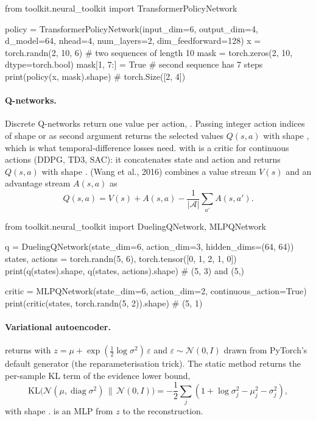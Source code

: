 \begin{pycode}
from toolkit.neural_toolkit import TransformerPolicyNetwork

policy = TransformerPolicyNetwork(input_dim=6, output_dim=4, d_model=64, nhead=4,
                                  num_layers=2, dim_feedforward=128)
x = torch.randn(2, 10, 6)                          # two sequences of length 10
mask = torch.zeros(2, 10, dtype=torch.bool)
mask[1, 7:] = True                                 # second sequence has 7 steps
print(policy(x, mask).shape)                       # torch.Size([2, 4])
\end{pycode}

\paragraph{Q-networks.}
Discrete Q-networks return one value per action, . Passing
integer action indices of shape  or  as second
argument returns the selected values $Q(s, a)$ with shape , which
is what temporal-difference losses need.  with
 is a critic for continuous actions (DDPG, TD3,
SAC): it concatenates state and action and returns $Q(s, a)$ with shape
.  (Wang et al., 2016) combines a value
stream $V(s)$ and an advantage stream $A(s, a)$ as
\begin{equation}
  Q(s, a) = V(s) + A(s, a) - \frac{1}{|\mathcal{A}|}\sum_{a'} A(s, a').
\end{equation}

\begin{pycode}
from toolkit.neural_toolkit import DuelingQNetwork, MLPQNetwork

q = DuelingQNetwork(state_dim=6, action_dim=3, hidden_dims=(64, 64))
states, actions = torch.randn(5, 6), torch.tensor([0, 1, 2, 1, 0])
print(q(states).shape, q(states, actions).shape)   # (5, 3) and (5,)

critic = MLPQNetwork(state_dim=6, action_dim=2, continuous_action=True)
print(critic(states, torch.randn(5, 2)).shape)     # (5, 1)
\end{pycode}

\paragraph{Variational autoencoder.}
 returns  with
$z = \mu + \exp(\tfrac{1}{2}\log\sigma^2)\,\varepsilon$ and
$\varepsilon \sim \mathcal{N}(0, I)$ drawn from PyTorch's default generator
(the reparameterisation trick). The static method  returns the per-sample KL term of the evidence lower bound,
\begin{equation}
  \mathrm{KL}\big(\mathcal{N}(\mu, \operatorname{diag}\sigma^2)\,\big\|\,\mathcal{N}(0, I)\big)
  = -\frac{1}{2}\sum_{j} \left(1 + \log\sigma_j^2 - \mu_j^2 - \sigma_j^2\right),
\end{equation}
with shape .  is an MLP from $z$ to the
reconstruction.

